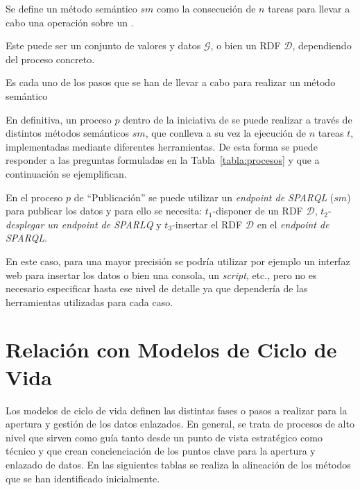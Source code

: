 \begin{definition}
Se define un método semántico $sm$ como la consecución de $n$ tareas para llevar a cabo
una operación sobre un \dataset. 
\end{definition}

Este \dataset puede ser un conjunto de valores y datos $\mathcal{G}$, o bien
un \dataset \gls{RDF} $\mathcal{D}$, dependiendo del proceso concreto.

\begin{definition}[Tarea $t$]
 Es cada uno de los pasos que se han de llevar a cabo para realizar un método semántico
\end{definition}


En definitiva, un proceso $p$ dentro de la iniciativa de \linkeddata se puede realizar a 
través de distintos métodos semánticos $sm$, que conlleva a su vez la ejecución de $n$ tareas $t$, implementadas mediante 
diferentes herramientas. De esta forma se puede responder a las preguntas formuladas en la Tabla~\ref{tabla:procesos} y 
que a continuación se ejemplifican.

\begin{Frame}
En el proceso $p$ de ``Publicación'' se puede utilizar un \textit{endpoint de SPARQL} ($sm$) para publicar
los datos y para ello se necesita: $t_1$-disponer de un \dataset RDF $\mathcal{D}$, $t_2$-\textit{desplegar un endpoint de SPARLQ} y 
$t_3$-insertar el \dataset RDF $\mathcal{D}$ en el \textit{endpoint de \gls{SPARQL}}. 
\end{Frame}

En este caso, para una mayor precisión se podría utilizar por ejemplo un interfaz web para insertar los datos 
o bien una consola, un \textit{script}, etc., pero no es necesario especificar hasta ese nivel de detalle ya que 
dependería de las herramientas utilizadas para cada caso.

\section{Relación con Modelos de Ciclo de Vida}
Los modelos de ciclo de vida definen las distintas fases o pasos a realizar para la apertura
y gestión de los datos enlazados. En general, se trata de procesos de alto nivel que sirven como guía tanto desde un punto de vista
estratégico como técnico y que crean concienciación de los puntos clave para la apertura y enlazado de datos. En las siguientes
tablas se realiza la alineación de los métodos que se han identificado inicialmente.


